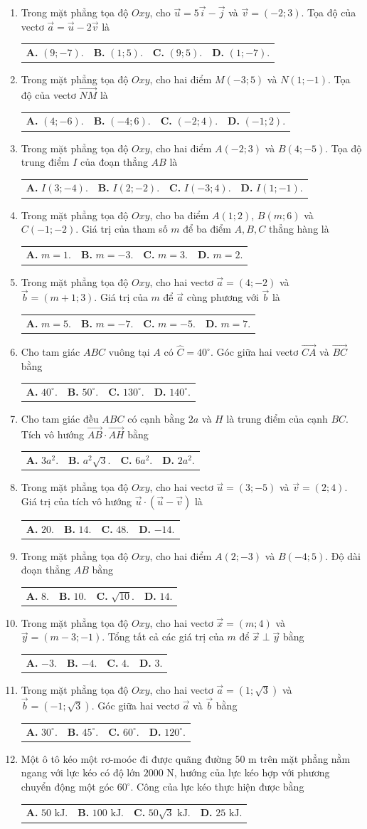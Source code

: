 \documentclass[10pt,a4paper]{article}
\makeatletter
\newcommand{\four}[4]{\par\noindent\begin{tabularx}{\linewidth}{@{}*{4}{>{\raggedright\arraybackslash}X}@{}}\textbf{A.} #1&\textbf{B.} #2&\textbf{C.} #3&\textbf{D.} #4\end{tabularx}}
\makeatother
\begin{document}
\begin{enumerate}
\item Trong mặt phẳng tọa độ $Oxy$, cho $\vec{u} = 5\vec{i} - \vec{j}$ và $\vec{v} = (-2; 3)$. Tọa độ của vectơ $\vec{a} = \vec{u} - 2\vec{v}$ là
\four{$(9; -7)$.}{$(1; 5)$.}{$(9; 5)$.}{$(1; -7)$.}

\item Trong mặt phẳng tọa độ $Oxy$, cho hai điểm $M(-3; 5)$ và $N(1; -1)$. Tọa độ của vectơ $\vec{NM}$ là
\four{$(4; -6)$.}{$(-4; 6)$.}{$(-2; 4)$.}{$(-1; 2)$.}

\item Trong mặt phẳng tọa độ $Oxy$, cho hai điểm $A(-2; 3)$ và $B(4; -5)$. Tọa độ trung điểm $I$ của đoạn thẳng $AB$ là
\four{$I(3; -4)$.}{$I(2; -2)$.}{$I(-3; 4)$.}{$I(1; -1)$.}

\item Trong mặt phẳng tọa độ $Oxy$, cho ba điểm $A(1; 2)$, $B(m; 6)$ và $C(-1; -2)$. Giá trị của tham số $m$ để ba điểm $A, B, C$ thẳng hàng là
\four{$m = 1$.}{$m = -3$.}{$m = 3$.}{$m = 2$.}
\pagebreak

\item Trong mặt phẳng tọa độ $Oxy$, cho hai vectơ $\vec{a} = (4; -2)$ và $\vec{b} = (m + 1; 3)$. Giá trị của $m$ để $\vec{a}$ cùng phương với $\vec{b}$ là
\four{$m = 5$.}{$m = -7$.}{$m = -5$.}{$m = 7$.}

\item Cho tam giác $ABC$ vuông tại $A$ có $\widehat{C} = 40^\circ$. Góc giữa hai vectơ $\vec{CA}$ và $\vec{BC}$ bằng
\four{$40^\circ$.}{$50^\circ$.}{$130^\circ$.}{$140^\circ$.}

\item Cho tam giác đều $ABC$ có cạnh bằng $2a$ và $H$ là trung điểm của cạnh $BC$. Tích vô hướng $\vec{AB} \cdot \vec{AH}$ bằng
\four{$3a^2$.}{$a^2\sqrt{3}$.}{$6a^2$.}{$2a^2$.}

\item Trong mặt phẳng tọa độ $Oxy$, cho hai vectơ $\vec{u} = (3; -5)$ và $\vec{v} = (2; 4)$. Giá trị của tích vô hướng $\vec{u} \cdot (\vec{u} - \vec{v})$ là
\four{$20$.}{$14$.}{$48$.}{$-14$.}

\item Trong mặt phẳng tọa độ $Oxy$, cho hai điểm $A(2; -3)$ và $B(-4; 5)$. Độ dài đoạn thẳng $AB$ bằng
\four{$8$.}{$10$.}{$\sqrt{10}$.}{$14$.}

\item Trong mặt phẳng tọa độ $Oxy$, cho hai vectơ $\vec{x} = (m; 4)$ và $\vec{y} = (m - 3; -1)$. Tổng tất cả các giá trị của $m$ để $\vec{x} \perp \vec{y}$ bằng
\four{$-3$.}{$-4$.}{$4$.}{$3$.}

\item Trong mặt phẳng tọa độ $Oxy$, cho hai vectơ $\vec{a} = (1; \sqrt{3})$ và $\vec{b} = (-1; \sqrt{3})$. Góc giữa hai vectơ $\vec{a}$ và $\vec{b}$ bằng
\four{$30^\circ$.}{$45^\circ$.}{$60^\circ$.}{$120^\circ$.}

\item Một ô tô kéo một rơ-moóc đi được quãng đường $50\text{ m}$ trên mặt phẳng nằm ngang với lực kéo có độ lớn $2000\text{ N}$, hướng của lực kéo hợp với phương chuyển động một góc $60^\circ$. Công của lực kéo thực hiện được bằng
\four{$50\text{ kJ}$.}{$100\text{ kJ}$.}{$50\sqrt{3}\text{ kJ}$.}{$25\text{ kJ}$.}
\end{enumerate}
\end{document}
